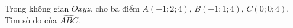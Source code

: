 \begin{ex}
Trong không gian $Oxyz$, cho ba điểm $A(-1;2;4)$, $B(-1;1;4)$, $C(0;0;4)$. Tìm số đo của $\widehat{ABC}$.
\end{ex}
